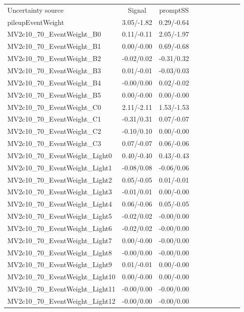 \begin{table}[h]
\scriptsize
\begin{center}
\begin{tabular}{l|ccccccccc}
\hline
\hline
Uncertainty source &Signal &promptSS \\
pileupEventWeight &3.05/-1.82 &0.29/-0.64 \\
MV2c10\_70\_EventWeight\_B0 &0.11/-0.11 &2.05/-1.97 \\
MV2c10\_70\_EventWeight\_B1 &0.00/-0.00 &0.69/-0.68 \\
MV2c10\_70\_EventWeight\_B2 &-0.02/0.02 &-0.31/0.32 \\
MV2c10\_70\_EventWeight\_B3 &0.01/-0.01 &-0.03/0.03 \\
MV2c10\_70\_EventWeight\_B4 &-0.00/0.00 &0.02/-0.02 \\
MV2c10\_70\_EventWeight\_B5 &0.00/-0.00 &0.00/-0.00 \\
MV2c10\_70\_EventWeight\_C0 &2.11/-2.11 &1.53/-1.53 \\
MV2c10\_70\_EventWeight\_C1 &-0.31/0.31 &0.07/-0.07 \\
MV2c10\_70\_EventWeight\_C2 &-0.10/0.10 &0.00/-0.00 \\
MV2c10\_70\_EventWeight\_C3 &0.07/-0.07 &0.06/-0.06 \\
MV2c10\_70\_EventWeight\_Light0 &0.40/-0.40 &0.43/-0.43 \\
MV2c10\_70\_EventWeight\_Light1 &-0.08/0.08 &-0.06/0.06 \\
MV2c10\_70\_EventWeight\_Light2 &0.05/-0.05 &0.01/-0.01 \\
MV2c10\_70\_EventWeight\_Light3 &-0.01/0.01 &0.00/-0.00 \\
MV2c10\_70\_EventWeight\_Light4 &0.06/-0.06 &0.05/-0.05 \\
MV2c10\_70\_EventWeight\_Light5 &-0.02/0.02 &-0.00/0.00 \\
MV2c10\_70\_EventWeight\_Light6 &-0.02/0.02 &-0.00/0.00 \\
MV2c10\_70\_EventWeight\_Light7 &0.00/-0.00 &-0.00/0.00 \\
MV2c10\_70\_EventWeight\_Light8 &-0.00/0.00 &-0.00/0.00 \\
MV2c10\_70\_EventWeight\_Light9 &0.01/-0.01 &0.00/-0.00 \\
MV2c10\_70\_EventWeight\_Light10 &0.00/-0.00 &0.00/-0.00 \\
MV2c10\_70\_EventWeight\_Light11 &-0.00/0.00 &-0.00/0.00 \\
MV2c10\_70\_EventWeight\_Light12 &-0.00/0.00 &-0.00/0.00 \\

\end{tabular}
\end{center}
\end{table}
